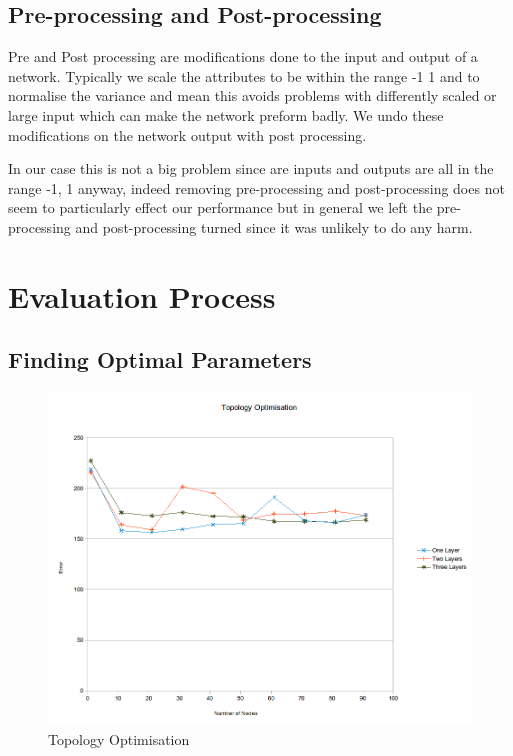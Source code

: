 \documentclass[10pt,a4paper]{article}
\begin{document}
\subsection{Pre-processing and Post-processing}
Pre and Post processing are modifications done to the input and output of a network.
Typically we scale the attributes to be within the range -1 1 and to normalise the variance and mean this avoids problems with differently scaled or large input which can make the network preform badly.
We undo these modifications on the network output with post processing.

In our case this is not a big problem since are inputs and outputs are all in the range -1, 1 anyway, indeed removing pre-processing and post-processing does not seem to particularly effect our performance but in general we left the pre-processing and post-processing turned since it was unlikely to do any harm. 

\section{Evaluation Process}

\subsection{Finding Optimal Parameters}

\begin{figure}[!ht]
     \centering
     \includegraphics[scale=0.6]{images/topology_graph.png}
     \caption{Topology Optimisation}
     \label{fig:topologyGraph}
\end{figure}
\end{document}
